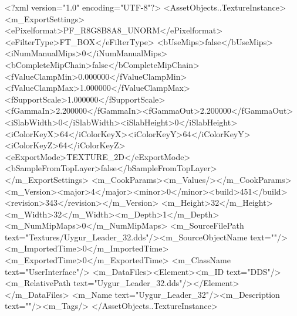 <?xml version="1.0" encoding="UTF-8"?>
<AssetObjects..TextureInstance>
  <m_ExportSettings>
    <ePixelformat>PF_R8G8B8A8_UNORM</ePixelformat><eFilterType>FT_BOX</eFilterType>
    <bUseMips>false</bUseMips><iNumManualMips>0</iNumManualMips><bCompleteMipChain>false</bCompleteMipChain>
    <fValueClampMin>0.000000</fValueClampMin><fValueClampMax>1.000000</fValueClampMax><fSupportScale>1.000000</fSupportScale>
    <fGammaIn>2.200000</fGammaIn><fGammaOut>2.200000</fGammaOut><iSlabWidth>0</iSlabWidth><iSlabHeight>0</iSlabHeight>
    <iColorKeyX>64</iColorKeyX><iColorKeyY>64</iColorKeyY><iColorKeyZ>64</iColorKeyZ>
    <eExportMode>TEXTURE_2D</eExportMode><bSampleFromTopLayer>false</bSampleFromTopLayer>
  </m_ExportSettings>
  <m_CookParams><m_Values/></m_CookParams>
  <m_Version><major>4</major><minor>0</minor><build>451</build><revision>343</revision></m_Version>
  <m_Height>32</m_Height><m_Width>32</m_Width><m_Depth>1</m_Depth><m_NumMipMaps>0</m_NumMipMaps>
  <m_SourceFilePath text="Textures/Uygur_Leader_32.dds"/><m_SourceObjectName text=""/>
  <m_ImportedTime>0</m_ImportedTime><m_ExportedTime>0</m_ExportedTime>
  <m_ClassName text="UserInterface"/>
  <m_DataFiles><Element><m_ID text="DDS"/><m_RelativePath text="Uygur_Leader_32.dds"/></Element></m_DataFiles>
  <m_Name text="Uygur_Leader_32"/><m_Description text=""/><m_Tags/>
</AssetObjects..TextureInstance>
